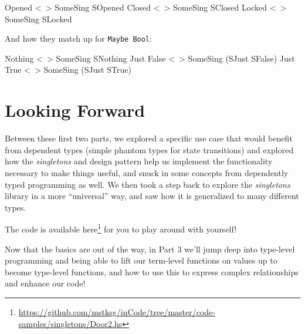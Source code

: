 \documentclass[]{article}
\newenvironment{Shaded}{}{}
\newcommand{\DataTypeTok}[1]{\textcolor[rgb]{0.56,0.13,0.00}{#1}}
\newcommand{\FunctionTok}[1]{\textcolor[rgb]{0.02,0.16,0.49}{#1}}
\newcommand{\NormalTok}[1]{#1}
\renewcommand{\href}[2]{#2\footnote{\url{#1}}}
\begin{document}
\begin{Shaded}
\begin{Highlighting}[]
\DataTypeTok{Opened}   \FunctionTok{<~>}    \DataTypeTok{SomeSing} \DataTypeTok{SOpened}
\DataTypeTok{Closed}   \FunctionTok{<~>}    \DataTypeTok{SomeSing} \DataTypeTok{SClosed}
\DataTypeTok{Locked}   \FunctionTok{<~>}    \DataTypeTok{SomeSing} \DataTypeTok{SLocked}
\end{Highlighting}
\end{Shaded}

And how they match up for \texttt{Maybe\ Bool}:

\begin{Shaded}
\begin{Highlighting}[]
\DataTypeTok{Nothing}      \FunctionTok{<~>}  \DataTypeTok{SomeSing} \DataTypeTok{SNothing}
\DataTypeTok{Just} \DataTypeTok{False}   \FunctionTok{<~>}  \DataTypeTok{SomeSing}\NormalTok{ (}\DataTypeTok{SJust} \DataTypeTok{SFalse}\NormalTok{)}
\DataTypeTok{Just} \DataTypeTok{True}    \FunctionTok{<~>}  \DataTypeTok{SomeSing}\NormalTok{ (}\DataTypeTok{SJust} \DataTypeTok{STrue}\NormalTok{)}
\end{Highlighting}
\end{Shaded}

\hypertarget{looking-forward}{%
\section{Looking Forward}\label{looking-forward}}

Between these first two parts, we explored a specific use case that would
benefit from dependent types (simple phantom types for state transitions) and
explored how the \emph{singletons} and design pattern help us implement the
functionality necessary to make things useful, and snuck in some concepts from
dependently typed programming as well. We then took a step back to explore the
\emph{singletons} library in a more ``universal'' way, and saw how it is
generalized to many different types.

The code is available
\href{https://github.com/mstksg/inCode/tree/master/code-samples/singletons/Door2.hs}{here}
for you to play around with yourself!

Now that the basics are out of the way, in Part 3 we'll jump deep into
type-level programming and being able to lift our term-level functions on values
up to become type-level functions, and how to use this to express complex
relationships and enhance our code!
\end{document}
